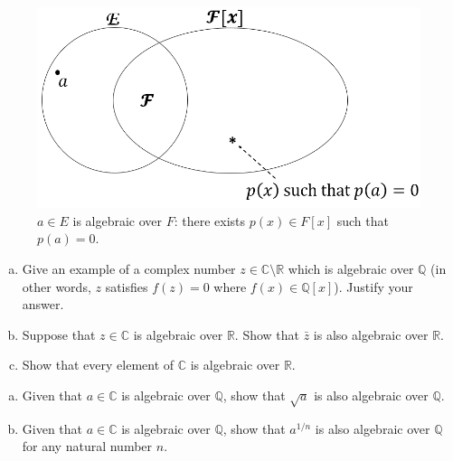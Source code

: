 \begin{figure}
\begin{center}
\includegraphics[scale=0.35]{images/algebraic_element.png}
\caption{$a\in E$ is algebraic over $F$:  there exists $p(x)\in F[x]$ such that $p(a)=0$.}\label{algebraicelement}
\end{center}
\end{figure}

\begin{exercise}{}
\begin {enumerate}[(a)]
\item
Give an example of a complex number $z \in \mathbb{C}\setminus \mathbb{R}$ which is algebraic over $\mathbb{Q}$ (in other words, $z$ satisfies $f(z)=0$ where $f(x) \in \mathbb Q[x]$). Justify your answer.
\item
Suppose that $z \in \mathbb{C}$ is algebraic over $\mathbb{R}$. Show that $\bar{z}$ is also algebraic over $\mathbb{R}$.
\item
Show that every element of $\mathbb{C}$ is algebraic over $\mathbb{R}$.
\end{enumerate}
\end{exercise}


\begin{exercise}{}
\begin {enumerate}[(a)]
\item
Given that $a \in \mathbb{C}$ is algebraic over $\mathbb{Q}$, show that $\sqrt{a}$ is also algebraic over $\mathbb{Q}$.
\item
Given that $a \in \mathbb{C}$ is algebraic over $\mathbb{Q}$, show that $a^{1/n}$ is also algebraic over $\mathbb{Q}$ for any natural number $n$.
\end{enumerate}
\end{exercise}


